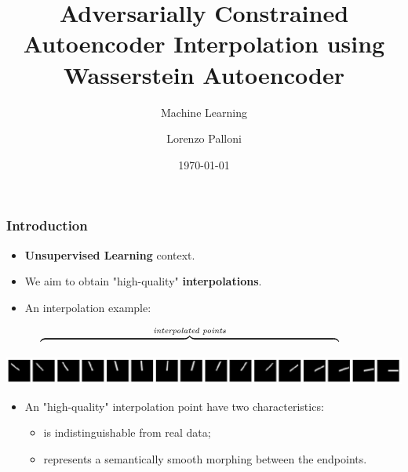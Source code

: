 \documentclass{beamer}
\title[ML - 2019/20 - Lorenzo Palloni]{Adversarially Constrained Autoencoder Interpolation using Wasserstein Autoencoder}
\subtitle{Machine Learning}
\author{Lorenzo Palloni}
\institute[]{
    University of Florence\\
    \medskip
    \textit{lorenzo.palloni@stud.unifi.it }
}
\date{\today}
\begin{document}
\begin{frame}
\titlepage %
\end{frame}

\begin{frame}
\frametitle{Introduction}
\begin{itemize}
  \item \textbf{Unsupervised Learning} context.
  \medskip
  \item We aim to obtain "high-quality" \textbf{interpolations}.
  \medskip
  \item An interpolation example:
\end{itemize}
\ \ \ \ \ \ $\overbrace{\ \ \ \ \ \ \ \ \ \ \ \ \ \ \ \ \ \ \ \ \ \ \ \ \ \ \ \ \ \ \ \ \ \ \ \ \ \ \ \ \ \ \ \ \ \ \ \ \ \ \ \ \ \ \ \ \ \ \ \ \ \ \ \ \ \ \ \ \ \ \ \ \ \ \ \ \ \ \ \ \ \ }^{\text{\textit{interpolated points}}}$
\vspace*{-\baselineskip}
\medskip
\begin{center}
  \includegraphics[width=1.0\textwidth,keepaspectratio]{./figures/perfect_interpolations}
\end{center}
\vspace*{-\baselineskip}
\begin{noindent}
  \rlap{\ \ $\nwarrow$} \hfill \llap{$\nearrow$\ \ }
\end{noindent}

\begin{noindent}
   \hfill {}
\end{noindent}
\medskip
\begin{itemize}
  \item An "high-quality" interpolation point have two characteristics:
  \medskip
  \begin{itemize}
    \item is indistinguishable from real data;
    \medskip
    \item represents a semantically smooth morphing between the endpoints.
  \end{itemize}
\end{itemize}
\end{frame}
\end{document}
